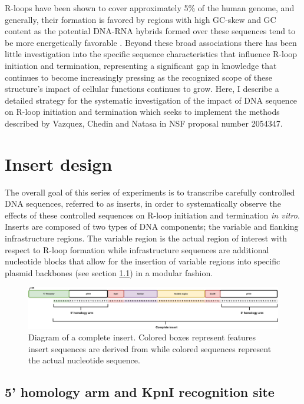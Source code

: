\documentclass[11pt]{article}
\begin{document}
R-loops have been shown to cover approximately 5\% of the human genome, and generally, their formation is favored by regions with high GC-skew and GC content as the potential DNA-RNA hybrids formed over these sequences tend to be more energetically favorable \cite{Stolz2019}. Beyond these broad associations there has been little investigation into the specific sequence characteristics that influence R-loop initiation and termination, representing a significant gap in knowledge that continues to become increasingly pressing as the recognized scope of these structure's impact of cellular functions continues to grow. Here, I describe a detailed strategy for the systematic investigation of the impact of DNA sequence on R-loop initiation and termination which seeks to implement the methods described by Vazquez, Chedin and Natasa in NSF proposal number 2054347. 


\section{Insert design}

The overall goal of this series of experiments is to transcribe carefully controlled DNA sequences, referred to as inserts, in order to systematically observe the effects of these controlled sequences on R-loop initiation and termination \emph{in vitro}. Inserts are composed of two types of DNA components; the variable and flanking infrastructure regions. The variable region is the actual region of interest with respect to R-loop formation while infrastructure sequences are additional nucleotide blocks that allow for the insertion of variable regions into specific plasmid backbones (see section \ref{}) in a modular fashion. 

\begin{figure}[H]
	\includegraphics[width=16cm]{images/variable_region/construct_diagrams-Detailed-Insert.png}
	\centering
	\caption{Diagram of a complete insert. Colored boxes represent features insert sequences are derived from while colored sequences represent the actual nucleotide sequence.}
	\label{fig:1}
\end{figure}


\subsection{5' homology arm and KpnI recognition site}
\end{document}
